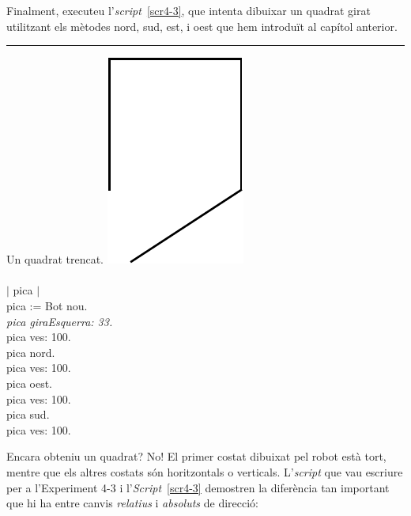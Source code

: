 \begin{center}
\colorbox{black}{}
\end{center}
{\small
\noindent
Finalment, executeu l'\emph{script}~\ref{scr4-3}, que intenta dibuixar un quadrat girat utilitzant els mètodes \textsf{nord}, \textsf{sud}, \textsf{est}, i \textsf{oest} que hem introduït al capítol anterior.}\\
\noindent
\rule{\textwidth}{3pt}

\begin{script}  Un quadrat trencat.
\newline
\newline
\noindent
\includegraphics[scale=0.75]{Imatges/figuraS4-3} 
\noindent
\textsf{\upshape
\\
\\$|$ pica $|$\\
pica := Bot nou.\\
{\itshape pica giraEsquerra: 33.}\\
pica ves: 100.\\
pica nord.\\
pica ves: 100.\\
pica oest.\\
pica ves: 100.\\
pica sud.\\
pica ves: 100.\\
}
\label{scr4-3}
\end{script}

Encara obteniu un quadrat? No! El primer costat dibuixat pel robot està tort, mentre que els altres costats són horitzontals o verticals. L'\emph{script} que vau escriure per a l'Experiment 4-3 i l'\emph{Script}~\ref{scr4-3} demostren la diferència tan important que hi ha entre canvis \emph{relatius} i \emph{absoluts} de direcció:

